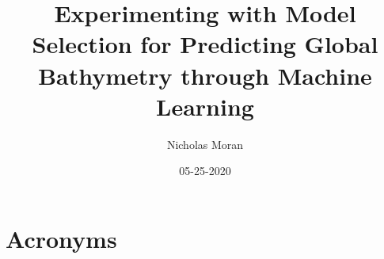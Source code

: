 
\usepackage[utf8]{inputenc}
\usepackage[english]{babel}
\usepackage[margin=1in]{geometry}
\usepackage{graphicx}
\usepackage[printonlyused]{acronym}
\usepackage{tikz}
\usepackage{wrapfig}
\usepackage{lscape}
\usepackage{rotating}
\usepackage{epstopdf}
\usepackage{setspace}
\usepackage[
    backend=biber,
    style=alphabetic,
    sorting=ynt
    ]{biblatex}

\graphicspath{{./images/}}

\doublespacing

    \title{Experimenting with Model Selection for Predicting Global Bathymetry through Machine Learning}
    \author{Nicholas Moran}
    \date{05-25-2020}
    \maketitle
    
    
    
    
    
    
    
    
    \section{Acronyms}
    
    \printbibliography
 